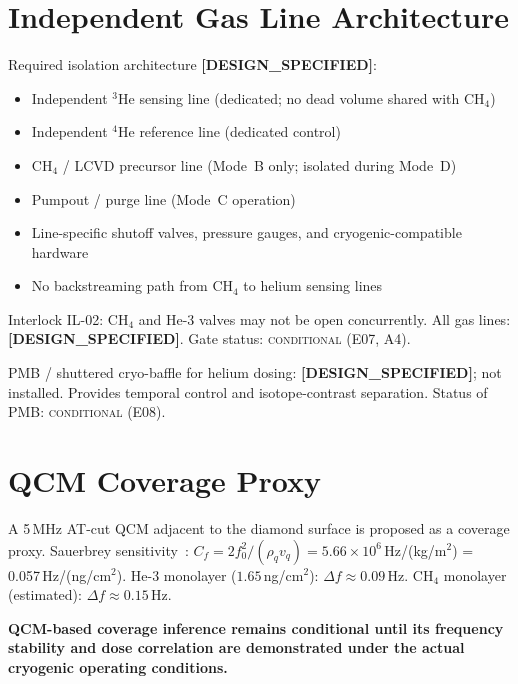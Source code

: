 \documentclass[12pt,a4paper]{article}
\newcommand{\conditional}{\textsc{conditional}}
\newcommand{\designspec}{\textbf{[DESIGN\_SPECIFIED]}}
\begin{document}
\section{Independent Gas Line Architecture}
\label{sec:gaslines}

Required isolation architecture \designspec{}:
\begin{itemize}[noitemsep]
  \item Independent $^3$He sensing line (dedicated; no dead volume shared with CH$_4$)
  \item Independent $^4$He reference line (dedicated control)
  \item CH$_4$ / LCVD precursor line (Mode~B only; isolated during Mode~D)
  \item Pumpout / purge line (Mode~C operation)
  \item Line-specific shutoff valves, pressure gauges, and cryogenic-compatible hardware
  \item No backstreaming path from CH$_4$ to helium sensing lines
\end{itemize}

Interlock IL-02: CH$_4$ and He-3 valves may not be open concurrently.
All gas lines: \designspec{}. Gate status: \conditional{} (E07, A4).

PMB / shuttered cryo-baffle for helium dosing: \designspec{}; not installed.
Provides temporal control and isotope-contrast separation.
Status of PMB: \conditional{} (E08).

\section{QCM Coverage Proxy}
\label{sec:qcm}

A 5\,MHz AT-cut QCM adjacent to the diamond surface is proposed as a coverage proxy.
Sauerbrey sensitivity~\cite{Sauerbrey1959}:
$C_f = 2f_0^2/(\rho_q v_q) = 5.66\times10^6$\,Hz/(kg/m$^2$) = 0.057\,Hz/(ng/cm$^2$).
He-3 monolayer ($1.65$\,ng/cm$^2$): $\Delta f \approx 0.09$\,Hz.
CH$_4$ monolayer (estimated): $\Delta f \approx 0.15$\,Hz.

\textbf{QCM-based coverage inference remains conditional until its frequency stability
and dose correlation are demonstrated under the actual cryogenic operating conditions.}
\end{document}
